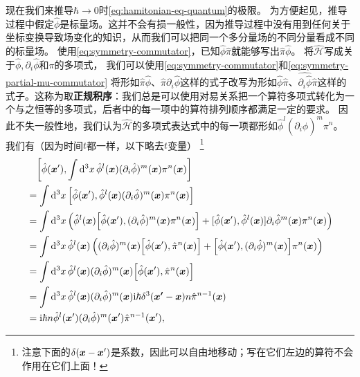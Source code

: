 \documentclass[UTF8, a4paper]{ctexart}
\newcommand*{\ii}{\mathrm{i}}
\begin{document}
现在我们来推导$\hbar\to 0$时\eqref{eq:hamitonian-eq-quantum}的极限。
为方便起见，推导过程中假定$\hat{\phi}$是标量场。这并不会有损一般性，因为推导过程中没有用到任何关于坐标变换导致场变化的知识，从而我们可以把同一个多分量场的不同分量看成不同的标量场。
使用\eqref{eq:symmetry-commutator}，已知$\hat{\phi} \hat{\pi}$就能够写出$\hat{\pi} \hat{\phi}$。
将$\hat{\mathcal{H}}$写成关于$\hat{\phi}, \partial_i \hat{\phi}$和$\pi$的多项式，
我们可以使用\eqref{eq:symmetry-commutator}和\eqref{eq:symmetry-partial-mu-commutator}
将形如$\hat{\pi}\hat{\phi}$、$\hat{\pi}\partial_i \hat{\phi}$这样的式子改写为形如$\hat{\phi}\hat{\pi}$、$\hat{\partial_i \hat{\phi}}\hat{\pi}$这样的式子。这称为取\textbf{正规积序}：我们总是可以使用对易关系把一个算符多项式转化为一个与之恒等的多项式，后者中的每一项中的算符排列顺序都满足一定的要求。
因此不失一般性地，我们认为$\hat{\mathcal{H}}$的多项式表达式中的每一项都形如$\hat{\phi}^l (\partial_i \hat{\phi})^m \pi^n$。
我们有（因为时间$t$都一样，以下略去$t$变量）%
\footnote{注意下面的$\delta(\vb*{x} - \vb*{x}')$是系数，因此可以自由地移动；写在它们左边的算符不会作用在它们上面！}
\[
    \begin{aligned}
        &\quad\comm{\hat{\phi}(\vb*{x}')}{\int \dd[3]{x} \hat{\phi}^l(\vb*{x}) (\partial_i \hat{\phi})^m (\vb*{x}) \pi^n(\vb*{x})} \\
        &= \int \dd[3]{x} \comm{\hat{\phi}(\vb*{x}')}{\hat{\phi}^l (\vb*{x}) (\partial_i \hat{\phi})^m (\vb*{x}) \pi^n (\vb*{x})} \\
        &= \int \dd[3]{x} \left( \hat{\phi}^l (\vb*{x}) \comm{\hat{\phi}(\vb*{x}')}{(\partial_i \hat{\phi})^m (\vb*{x}) \pi^n (\vb*{x})} + [\hat{\phi}(\vb*{x}'), \hat{\phi}^l (\vb*{x})] \partial_i \hat{\phi}^m (\vb*{x}) \pi^n(\vb*{x}) \right) \\
        &= \int \dd[3]{x} \hat{\phi}^l (\vb*{x}) \left( (\partial_i \hat{\phi})^m (\vb*{x}) \comm{\hat{\phi} (\vb*{x}')}{\hat{\pi}^n (\vb*{x})} + \comm{\hat{\phi} (\vb*{x}')}{(\partial_i \hat{\phi})^m (\vb*{x})} \pi^n (\vb*{x}) \right) \\
        &= \int \dd[3]{x} \hat{\phi}^l (\vb*{x}) (\partial_i \hat{\phi})^m (\vb*{x}) \comm{\hat{\phi} (\vb*{x}')}{\hat{\pi}^n (\vb*{x})} \\
        &= \int \dd[3]{x} \hat{\phi}^l (\vb*{x}) (\partial_i \hat{\phi})^m (\vb*{x}) \ii \hbar \delta^3(\vb*{x'} - \vb*{x}) n \hat{\pi}^{n-1}(\vb*{x}) \\
        &= \ii \hbar n \hat{\phi}^l (\vb*{x}') (\partial_i \hat{\phi})^m (\vb*{x}') \hat{\pi}^{n-1}(\vb*{x}'), 
    \end{aligned}
\]
\end{document}
